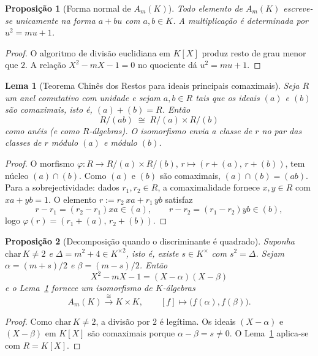 \documentclass[11pt,a4paper]{article}
\newtheorem{proposicao}{Proposição}
\newtheorem{lema}{Lema}
\begin{document}
\begin{proposicao}[Forma normal de \(A_m(K)\)]
\label{prop:forma-Am}
Todo elemento de \(A_m(K)\) escreve-se unicamente na forma \(a+bu\) com
\(a,b\in K\).
A multiplicação é determinada por \(u^2=mu+1\).
\end{proposicao}

\begin{proof}
O algoritmo de divisão euclidiana em \(K[X]\) produz resto de grau menor
que \(2\). A relação \(X^2-mX-1=0\) no quociente dá \(u^2=mu+1\).
\end{proof}

\begin{lema}[Teorema Chinês dos Restos para ideais principais comaximais]
\label{lema:tcr}
Seja \(R\) um anel comutativo com unidade e sejam \(a,b\in R\) tais que os
ideais \((a)\) e \((b)\) são comaximais, isto é, \((a)+(b)=R\).
Então
\[
R/(ab)\;\cong\; R/(a)\times R/(b)
\]
como anéis (e como \(R\)-álgebras).
O isomorfismo envia a classe de \(r\) no par das classes de \(r\) módulo
\((a)\) e módulo \((b)\).
\end{lema}

\begin{proof}
O morfismo \(\varphi\colon R\to R/(a)\times R/(b)\),
\(r\mapsto(r+(a),\,r+(b))\), tem núcleo \((a)\cap(b)\).
Como \((a)\) e \((b)\) são comaximais, \((a)\cap(b)=(ab)\).
Para a sobrejectividade: dados \(r_1,r_2\in R\), a comaximalidade fornece
\(x,y\in R\) com \(xa+yb=1\).
O elemento \(r:=r_2\,xa+r_1\,yb\) satisfaz
\[
r-r_1=(r_2-r_1)xa\in(a),
\qquad
r-r_2=(r_1-r_2)yb\in(b),
\]
logo \(\varphi(r)=(r_1+(a),\,r_2+(b))\).
\end{proof}

\begin{proposicao}[Decomposição quando o discriminante é quadrado]
\label{prop:decomposicao}
Suponha \(\mathrm{char}\,K\neq 2\) e \(\Delta=m^2+4\in K^{\times 2}\), isto é,
existe \(s\in K^\times\) com \(s^2=\Delta\).
Sejam \(\alpha=(m+s)/2\) e \(\beta=(m-s)/2\).
Então
\[
X^2-mX-1=(X-\alpha)(X-\beta)
\]
e o Lema~\ref{lema:tcr} fornece um isomorfismo de \(K\)-álgebras
\[
A_m(K)\xrightarrow{\cong} K\times K,
\qquad
[f]\longmapsto\bigl(f(\alpha),f(\beta)\bigr).
\]
\end{proposicao}

\begin{proof}
Como \(\mathrm{char}\,K\neq 2\), a divisão por \(2\) é legítima.
Os ideais \((X-\alpha)\) e \((X-\beta)\) em \(K[X]\) são comaximais porque
\(\alpha-\beta=s\neq 0\).
O Lema~\ref{lema:tcr} aplica-se com \(R=K[X]\).
\end{proof}
\end{document}
